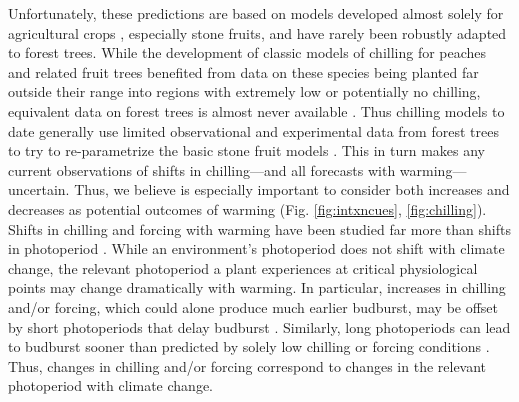 \documentclass[11pt,letter]{article}
\begin{document}
Unfortunately, these predictions are based on models developed almost solely for agricultural crops \citep[but see][]{harrington2015}, especially stone fruits, and have rarely been robustly adapted to forest trees. While the development of classic models of chilling for peaches and related fruit trees benefited from data on these species being planted far outside their range into regions with extremely low or potentially no chilling, equivalent data on forest trees is almost never available \citep{dennis2003}. Thus chilling models to date generally use limited observational and experimental data from forest trees to try to re-parametrize the basic stone fruit models \citep{Chuine2000}. This in turn makes any current observations of shifts in chilling---and all forecasts with warming---uncertain. Thus, we believe is especially important to consider both increases and decreases as potential outcomes of warming (Fig. \ref{fig:intxncues}, \ref{fig:chilling}). \\

Shifts in chilling and forcing with warming have been studied far more than shifts in photoperiod \citep[but see][]{saikkonen2012,way2015}. While an environment's photoperiod does not shift with climate change, the relevant photoperiod a plant experiences at critical physiological points may change dramatically with warming. In particular, increases in chilling and/or forcing, which could alone produce much earlier budburst, may be offset by short photoperiods that delay budburst \citep{gauzere2019}. Similarly, long photoperiods can lead to budburst sooner than predicted by solely low chilling or forcing conditions \citep{Nienstaedt:1966aa,Myking:1995,Partanen:1998aa}. Thus, changes in chilling and/or forcing correspond to changes in the relevant photoperiod with climate change. \\
\end{document}

